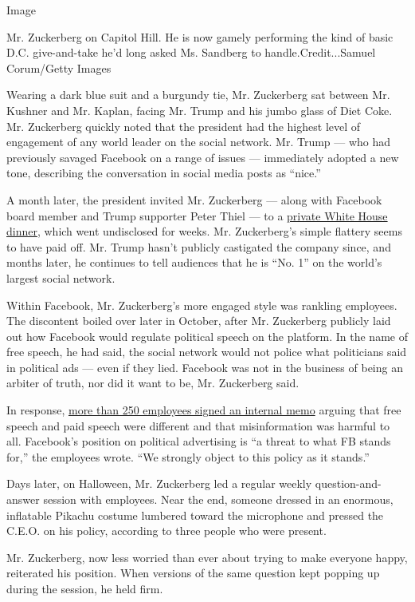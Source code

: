 Image

Mr. Zuckerberg on Capitol Hill. He is now gamely performing the kind of
basic D.C. give-and-take he'd long asked Ms. Sandberg to
handle.Credit...Samuel Corum/Getty Images

Wearing a dark blue suit and a burgundy tie, Mr. Zuckerberg sat between
Mr. Kushner and Mr. Kaplan, facing Mr. Trump and his jumbo glass of Diet
Coke. Mr. Zuckerberg quickly noted that the president had the highest
level of engagement of any world leader on the social network. Mr. Trump
--- who had previously savaged Facebook on a range of issues ---
immediately adopted a new tone, describing the conversation in social
media posts as ``nice.''

A month later, the president invited Mr. Zuckerberg --- along with
Facebook board member and Trump supporter Peter Thiel --- to a
\href{https://www.nbcnews.com/news/amp/ncna1087986}{private White House
dinner}, which went undisclosed for weeks. Mr. Zuckerberg's simple
flattery seems to have paid off. Mr. Trump hasn't publicly castigated
the company since, and months later, he continues to tell audiences that
he is ``No. 1'' on the world's largest social network.

Within Facebook, Mr. Zuckerberg's more engaged style was rankling
employees. The discontent boiled over later in October, after Mr.
Zuckerberg publicly laid out how Facebook would regulate political
speech on the platform. In the name of free speech, he had said, the
social network would not police what politicians said in political ads
--- even if they lied. Facebook was not in the business of being an
arbiter of truth, nor did it want to be, Mr. Zuckerberg said.

In response,
\href{https://www.nytimes.com/2019/10/28/technology/facebook-mark-zuckerberg-political-ads.html}{more
than 250 employees signed an internal memo} arguing that free speech and
paid speech were different and that misinformation was harmful to all.
Facebook's position on political advertising is ``a threat to what FB
stands for,'' the employees wrote. ``We strongly object to this policy
as it stands.''

Days later, on Halloween, Mr. Zuckerberg led a regular weekly
question-and-answer session with employees. Near the end, someone
dressed in an enormous, inflatable Pikachu costume lumbered toward the
microphone and pressed the C.E.O. on his policy, according to three
people who were present.

Mr. Zuckerberg, now less worried than ever about trying to make everyone
happy, reiterated his position. When versions of the same question kept
popping up during the session, he held firm.

